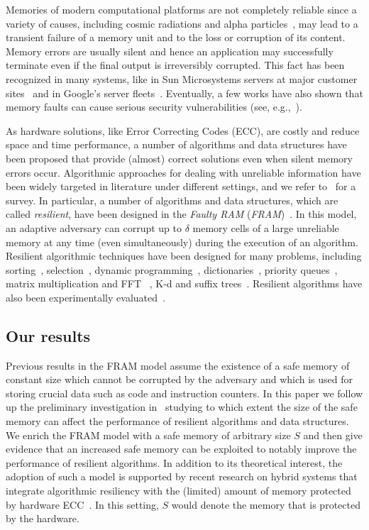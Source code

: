 \documentclass[review,number]{elsarticle}
\begin{document}
Memories of modern computational platforms are not completely reliable since a
variety of causes, including cosmic radiations and alpha particles~\cite{B05},
may lead to a transient failure of a memory unit and to the loss or corruption
of its content. Memory errors are usually silent and hence an application may
successfully terminate even if the final output is irreversibly corrupted. This
fact has been recognized in many systems, like in Sun Microsystems servers at
major customer sites~\cite{B05} and in Google's server fleets~\cite{SPW11}.
Eventually, a few works have also shown that memory faults can cause serious
security vulnerabilities (see, e.g.,~\cite{GA03}).

As hardware solutions, like Error Correcting Codes (ECC), are costly and
reduce space and time performance, a number of algorithms and data structures
have been proposed that provide (almost) correct solutions even when silent
memory errors occur. Algorithmic approaches for dealing with unreliable
information have been widely targeted in literature under different settings,
and we refer to~\cite{FINO07} for a survey. In particular, a number of
algorithms and data structures, which are called \emph{resilient}, have been
designed in the \emph{Faulty RAM} (\emph{FRAM})~\cite{FI08}. In this model, an
adaptive adversary can corrupt up to $\delta$ memory cells of a large unreliable
memory at any time (even simultaneously) during the execution of an algorithm.
Resilient algorithmic techniques have been designed for many problems, including
sorting~\cite{FGI09}, selection~\cite{KT12}, dynamic programming~\cite{CFFS11},
dictionaries~\cite{FINO09}, priority queues~\cite{JMM07}, matrix multiplication
and FFT ~\cite{RE13}, K-d and suffix trees~\cite{GMV12,CDK11}. Resilient
algorithms have also been experimentally
evaluated~\cite{PI14,RE13,PetrilloGI13,PetrilloFI10}.

\subsection{Our results}
Previous results in the FRAM model assume the existence of a {safe memory}
of constant size which cannot be corrupted by the adversary and which is used for
storing crucial data such as  code and instruction counters. In this paper we
follow up the preliminary investigation in~\cite{CFFS11} studying to which
extent the size of the safe memory can affect the performance of resilient
algorithms and data structures. We enrich the FRAM model with a safe memory of
arbitrary size $S$ and then give evidence that an increased safe memory can be
exploited to notably improve the performance of resilient algorithms. In
addition to its theoretical interest, the adoption of such a model is supported
by recent research on hybrid systems that integrate algorithmic
resiliency with the (limited) amount of memory protected by hardware
ECC~\cite{LI13}. In this setting, $S$ would denote the memory that is protected
by the hardware.
\end{document}
